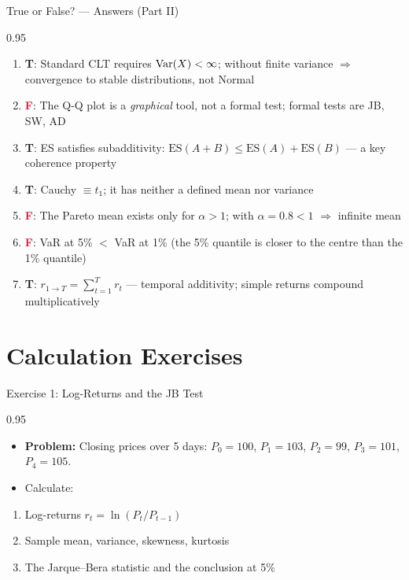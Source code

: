 \documentclass[9pt, aspectratio=169, t]{beamer}
\begin{document}
\begin{frame}{True or False? --- Answers (Part II)}
\begin{cminipage}{0.95\textwidth}
    \footnotesize
    \begin{enumerate}\setlength{\itemsep}{1pt}
        \setcounter{enumi}{7}
        \item \textcolor{Forest}{\textbf{T}}: Standard CLT requires $\text{Var}(X) < \infty$; without finite variance $\Rightarrow$ convergence to stable distributions, not Normal
        \item \textcolor{Crimson}{\textbf{F}}: The Q-Q plot is a \textit{graphical} tool, not a formal test; formal tests are JB, SW, AD
        \item \textcolor{Forest}{\textbf{T}}: ES satisfies subadditivity: $\text{ES}(A+B) \leq \text{ES}(A) + \text{ES}(B)$ --- a key coherence property
        \item \textcolor{Forest}{\textbf{T}}: Cauchy $\equiv t_1$; it has neither a defined mean nor variance
        \item \textcolor{Crimson}{\textbf{F}}: The Pareto mean exists only for $\alpha > 1$; with $\alpha = 0.8 < 1$ $\Rightarrow$ infinite mean
        \item \textcolor{Crimson}{\textbf{F}}: VaR at 5\% $<$ VaR at 1\% (the 5\% quantile is closer to the centre than the 1\% quantile)
        \item \textcolor{Forest}{\textbf{T}}: $r_{1 \to T} = \sum_{t=1}^T r_t$ --- temporal additivity; simple returns compound multiplicatively
    \end{enumerate}
\end{cminipage}
\end{frame}

\section{Calculation Exercises}

\begin{frame}{Exercise 1: Log-Returns and the JB Test}
\begin{cminipage}{0.95\textwidth}
    \begin{itemize}\setlength{\itemsep}{0pt}
        \item \textbf{Problem:} Closing prices over 5 days: $P_0 = 100$, $P_1 = 103$, $P_2 = 99$, $P_3 = 101$, $P_4 = 105$.
        \item Calculate:
    \end{itemize}
    \begin{enumerate}\setlength{\itemsep}{0pt}
        \item Log-returns $r_t = \ln(P_t / P_{t-1})$
        \item Sample mean, variance, skewness, kurtosis
        \item The Jarque--Bera statistic and the conclusion at 5\%
    \end{enumerate}
\end{cminipage}
\end{frame}
\end{document}
